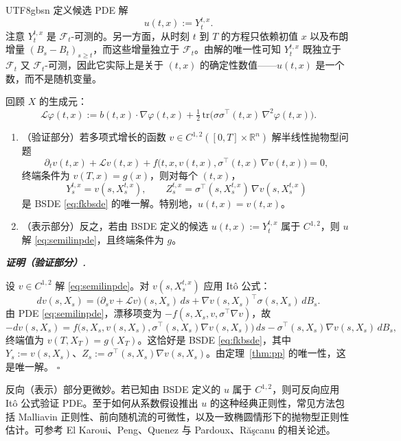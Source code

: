 \documentclass{article}
\newenvironment{proof}[1][证明]{%
  \par\smallskip\noindent\textit{\textbf{#1.}}\quad\ignorespaces
}{%
  \hfill$\square$\par\smallskip
}
\theoremstyle{plain}
\theoremstyle{definition}
\theoremstyle{remark}
\newcommand{\R}{\mathbb{R}}
\newcommand{\F}{\mathcal{F}}
\newcommand{\Lc}{\mathcal{L}}
\begin{document}
\begin{CJK*}{UTF8}{gbsn}
定义候选 PDE 解
\[
  u(t, x) := Y^{t,x}_t.
\]
注意 $Y^{t,x}_t$ 是 $\F_t$-可测的。另一方面，从时刻 $t$ 到 $T$ 的方程只依赖初值 $x$ 以及布朗增量 $(B_s - B_t)_{s \ge t}$，而这些增量独立于 $\F_t$。由解的唯一性可知 $Y^{t,x}_t$ 既独立于 $\F_t$ 又 $\F_t$-可测，因此它实际上是关于 $(t,x)$ 的确定性数值——$u(t, x)$ 是一个数，而不是随机变量。

回顾 $X$ 的生成元：
\[
  \Lc \varphi(t, x) := b(t, x) \cdot \nabla \varphi(t, x) + \tfrac12\, \mathrm{tr}\!\big(\sigma\sigma^{\top}(t, x)\, \nabla^2 \varphi(t, x)\big).
\]

\begin{theorem}\label{thm:nlfk}
\hfill
\begin{enumerate}
  \item[(a)] （验证部分）若多项式增长的函数 $v \in C^{1,2}([0, T] \times \R^n)$ 解半线性抛物型问题
  \begin{equation}\label{eq:semilinpde}
    \partial_t v(t, x) + \Lc v(t, x) + f\!\big(t, x, v(t, x), \sigma^{\top}(t, x)\, \nabla v(t, x)\big) = 0,
  \end{equation}
  终端条件为 $v(T, x) = g(x)$，则对每个 $(t, x)$，
  \[
    Y^{t,x}_s = v(s, X^{t,x}_s), \qquad Z^{t,x}_s = \sigma^{\top}(s, X^{t,x}_s)\, \nabla v(s, X^{t,x}_s)
  \]
  是 BSDE \eqref{eq:fkbsde} 的唯一解。特别地，$u(t, x) = v(t, x)$。

  \item[(b)] （表示部分）反之，若由 BSDE 定义的候选 $u(t, x) := Y^{t,x}_t$ 属于 $C^{1,2}$，则 $u$ 解 \eqref{eq:semilinpde}，且终端条件为 $g$。
\end{enumerate}
\end{theorem}

\begin{proof}[证明（验证部分）]
设 $v \in C^{1,2}$ 解 \eqref{eq:semilinpde}。对 $v(s, X^{t,x}_s)$ 应用 It\^o 公式：
\[
  dv(s, X_s) = \big(\partial_s v + \Lc v\big)(s, X_s)\,ds + \nabla v(s, X_s)^{\top} \sigma(s, X_s)\, dB_s.
\]
由 PDE \eqref{eq:semilinpde}，漂移项变为 $-f(s, X_s, v, \sigma^{\top} \nabla v)$，故
\[
  -dv(s, X_s) = f\!\big(s, X_s, v(s, X_s), \sigma^{\top}(s, X_s) \nabla v(s, X_s)\big)\,ds - \sigma^{\top}(s, X_s) \nabla v(s, X_s)\, dB_s,
\]
终端值为 $v(T, X_T) = g(X_T)$。这恰好是 BSDE \eqref{eq:fkbsde}，其中 $Y_s := v(s, X_s)$、$Z_s := \sigma^{\top}(s, X_s) \nabla v(s, X_s)$。由定理~\ref{thm:pp} 的唯一性，这是唯一解。
\end{proof}

反向（表示）部分更微妙。若已知由 BSDE 定义的 $u$ 属于 $C^{1,2}$，则可反向应用 It\^o 公式验证 PDE。至于如何从系数假设推出 $u$ 的这种经典正则性，常见方法包括 Malliavin 正则性、前向随机流的可微性，以及一致椭圆情形下的抛物型正则性估计。可参考 El Karoui、Peng、Quenez \cite{el-karoui-quenez} 与 Pardoux、R\u{a}\c{s}canu \cite{pardoux-rascanu} 的相关论述。


\end{CJK*}
\end{document}
